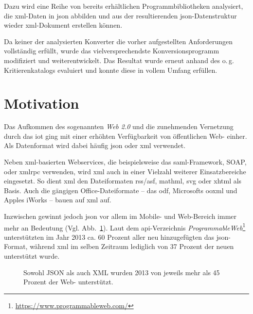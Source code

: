 Dazu wird eine Reihe von bereits erhältlichen Programmbibliotheken analysiert,
die \acrshort{xml}-Daten in \acrshort{json} abbilden und aus der resultierenden
\acrshort{json}-Datenstruktur wieder \acrshort{xml}-Dokument erstellen können.


Da keiner der analysierten Konverter die vorher aufgestellten Anforderungen
vollständig erfüllt, wurde das vielversprechendste Konversionsprogramm
modifiziert und weiterentwickelt. Das Resultat wurde erneut anhand des o.\,g.
Kritierenkatalogs evaluiert und konnte diese in vollem Umfang erfüllen.

\section{Motivation}
\label{sec:motivation}
Das Aufkommen des sogenannten \emph{Web 2.0} und die zunehmenden Vernetzung
durch das \gls{iot} ging mit einer erhöhten
Verfügbarkeit von öffentlichen Web- einher. Als Datenformat wird dabei
häufig \acrshort{json} oder \acrshort{xml} verwendet.

Neben \acrshort{xml}-basierten Webservices, die beispielsweise das \acrshort{saml}-Framework, SOAP,
oder \gls{xmlrpc} verwenden, wird \acrshort{xml} auch in einer Vielzahl weiterer
Einsatzbereiche eingesetzt. So dient \acrshort{xml} den Dateiformaten \acrshort{rss}/\acrshort{asf}, \acrshort{mathml},
\gls{svg} oder \gls{xhtml} als Basis. Auch die gängigen
Office-Dateiformate -- das \acrfull{odf}, Microsofts %
\acrfull{ooxml} und Apples iWorks -- bauen auf \acrshort{xml} auf. %

Inzwischen gewinnt jedoch \acrshort{json} vor allem im Mobile-
und Web-Bereich immer mehr an Bedeutung (Vgl. Abb.~\ref{fig:xmljsonapis}). Laut dem \acrshort{api}-Verzeichnis
\emph{ProgrammableWeb}\footnote{\url{https://www.programmableweb.com/}} unterstützten im Jahr 2013 ca. 60 Prozent aller neu
hinzugefügten  das \acrshort{json}-Format, während
\acrshort{xml} im selben Zeitraum lediglich von 37 Prozent der neuen 
unterstützt wurde.~\cite{duvander2013convergence}

\begin{figure}[h!]
    \begin{center}
        
    \end{center}
    \caption{Sowohl JSON als auch XML wurden 2013 von jeweils mehr als 45 Prozent der Web- unterstützt.}
    \label{fig:xmljsonapis}
\end{figure}


